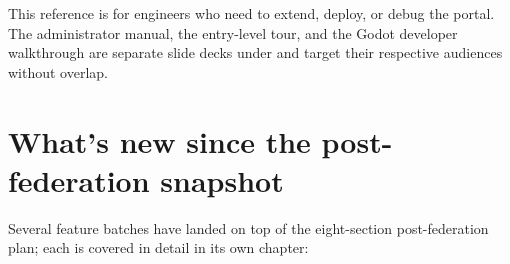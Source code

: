 \begin{snapnote}[title={Audience}]
This reference is for engineers who need to extend, deploy, or debug the
portal. The administrator manual, the entry-level tour, and the Godot
developer walkthrough are separate slide decks under
 and target their respective audiences
without overlap.
\end{snapnote}

\section{What's new since the post-federation snapshot}

Several feature batches have landed on top of the eight-section
post-federation plan; each is covered in detail in its own chapter:


